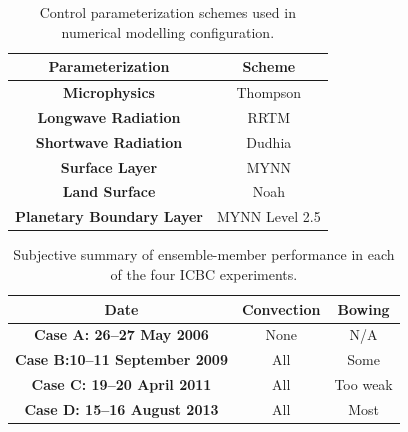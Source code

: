 \documentclass{ametsoc}
\begin{document}
{%
%
\begin{table}[tb]
\caption{Control parameterization schemes used in numerical modelling configuration.}
\label{tab:WRFconfig}
\begin{center}
\begin{tabular}{cc}
\hline \hline
{\textbf{Parameterization}} & {\textbf{Scheme}} \\ \hline
{\textbf{Microphysics}} & Thompson \\ 
{\textbf{Longwave Radiation}} & RRTM  \\ 
{\textbf{Shortwave Radiation}} & Dudhia \\ 
{\textbf{Surface Layer}} & MYNN \\ 
{\textbf{Land Surface}} & Noah \\ 
{\textbf{Planetary Boundary Layer}} & MYNN Level 2.5  \\ 
\end{tabular}
\end{center}
\end{table}

\begin{table}[tb]
\caption{Subjective summary of ensemble-member performance in each of the four ICBC experiments.}
\label{tab:summary}
\begin{center}
\begin{tabular}{c|cc}
\hline \hline
{\textbf{Date}} & {\textbf{Convection}} & {\textbf{Bowing}} \\ \hline
{\textbf{Case A: 26--27 May 2006}} & None & N/A \\
{\textbf{Case B:10--11 September 2009}} & All & Some  \\ 
{\textbf{Case C: 19--20 April 2011}} & All & Too weak \\ 
{\textbf{Case D: 15--16 August 2013}} & All & Most\\ 
\end{tabular}
\end{center}
\end{table}

}
\end{document}
